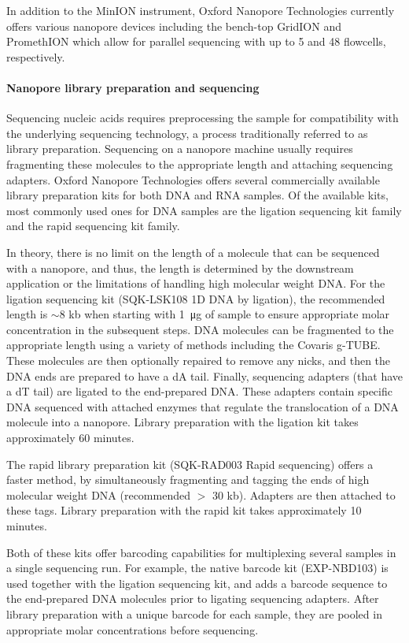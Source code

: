 In addition to the MinION instrument, Oxford Nanopore Technologies
currently offers various nanopore devices including the bench-top
GridION and PromethION which allow for parallel sequencing with up to 5
and 48 flowcells, respectively.


\paragraph{Nanopore library preparation and sequencing}
Sequencing nucleic acids requires preprocessing the sample for
compatibility with the underlying sequencing technology, a process
traditionally referred to as library preparation.
%
Sequencing on a nanopore machine usually requires fragmenting these
molecules to the appropriate length and attaching sequencing adapters.
%
Oxford Nanopore Technologies offers several commercially available
library preparation kits for both DNA and RNA samples.  Of the available
kits, most commonly used ones for DNA samples are the ligation
sequencing kit family and the rapid sequencing kit family.

In theory, there is no limit on the length of a molecule that can be
sequenced with a nanopore, and thus, the length is determined by the
downstream application or the limitations of handling high molecular
weight DNA. For the ligation sequencing kit (SQK-LSK108 1D DNA by
ligation), the recommended length is $\sim$8 kb when starting with
\SI{1}{\micro\gram} of sample to ensure appropriate molar concentration
in the subsequent steps.  DNA molecules can be fragmented to the
appropriate length using a variety of methods including the Covaris
g-TUBE.
%
These molecules are then optionally repaired to remove any nicks, and
then the DNA ends are prepared to have a dA tail. Finally, sequencing
adapters (that have a dT tail) are ligated to the end-prepared DNA.
These adapters contain specific DNA sequenced with attached enzymes that
regulate the translocation of a DNA molecule into a nanopore.  Library
preparation with the ligation kit takes approximately 60 minutes.

The rapid library preparation kit (SQK-RAD003 Rapid sequencing) offers a
faster method, by simultaneously fragmenting and tagging the ends of
high molecular weight DNA (recommended $>$ 30 kb). Adapters are then
attached to these tags.  Library preparation with the rapid kit takes
approximately 10 minutes.

Both of these kits offer barcoding capabilities for multiplexing several
samples in a single sequencing run. For example, the native barcode kit
(EXP-NBD103) is used together with the ligation sequencing kit, and
adds a barcode sequence to the end-prepared DNA molecules prior to
ligating sequencing adapters. After library preparation with a unique
barcode for each sample, they are pooled in appropriate molar
concentrations before sequencing.

